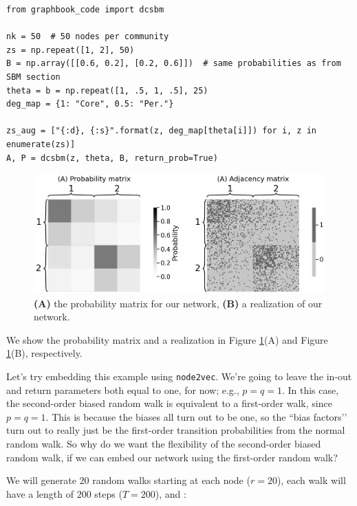 \begin{lstlisting}[style=python]
from graphbook_code import dcsbm

nk = 50  # 50 nodes per community
zs = np.repeat([1, 2], 50)
B = np.array([[0.6, 0.2], [0.2, 0.6]])  # same probabilities as from SBM section
theta = b = np.repeat([1, .5, 1, .5], 25)
deg_map = {1: "Core", 0.5: "Per."}

zs_aug = ["{:d}, {:s}".format(z, deg_map[theta[i]]) for i, z in enumerate(zs)]
A, P = dcsbm(z, theta, B, return_prob=True)
\end{lstlisting}

\begin{figure}
    \centering
    \includegraphics[width=0.8\linewidth]{next/Images/diff_ex.png}
    \caption[Example for \texttt{node2vec}]{\textbf{(A)} the probability matrix for our network, \textbf{(B)} a realization of our network.}
    \label{fig:next:diff:ex}
\end{figure}

We show the probability matrix and a realization in Figure \ref{fig:next:diff:ex}(A) and Figure \ref{fig:next:diff:ex}(B), respectively.

Let's try embedding this example using \texttt{node2vec}. We're going to leave the in-out and return parameters both equal to one, for now; e.g., $p = q = 1$. In this case, the second-order biased random walk is equivalent to a first-order walk, since $p = q = 1$. This is because the biases all turn out to be one, so the ``bias factors’’ turn out to really just be the first-order transition probabilities from the normal random walk. So why do we want the flexibility of the second-order biased random walk, if we can embed our network using the first-order random walk?

We will generate $20$ random walks starting at each node ($r = 20$), each walk will have a length of $200$ steps ($T = 200$), and :

\begin{lstlisting}[style=python]

\end{lstlisting}

